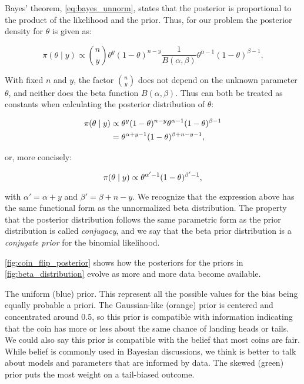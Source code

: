 Bayes' theorem, \autoref{eq:bayes_unnorm}, states that the posterior is proportional to the product of the likelihood and the prior. Thus, for our problem the posterior density for $\theta$ is given as: 

\begin{equation*}
    \pi (\theta \mid y) \propto \binom{n}{y} \theta^y (1-\theta)^{n-y} \frac{1}{B(\alpha, \beta)} \theta^{\alpha-1}(1-\theta)^{\beta -1}.
\end{equation*}

With fixed $n$ and $y$, the factor $\binom{n}{y}$ does not depend on the unknown parameter $\theta$, and neither does the beta function $B(\alpha, \beta)$. Thus can both be treated as constants when calculating the posterior distribution of $\theta$:

\begin{align*}
    \pi \qty(\theta \mid y) &\propto \theta^y (1-\theta)^{n-y} \theta^{\alpha-1}(1-\theta)^{\beta -1} \\
    &= \theta^{\alpha + y -1} (1-\theta)^{\beta + n-y -1},
\end{align*}

or, more concisely:

\begin{equation}\label{eq:coin_posterior}
    \pi \qty(\theta \mid y) \propto \theta^{\alpha' -1} (1-\theta)^{\beta' -1},
\end{equation}

with $\alpha'=\alpha+y$ and $\beta' = \beta + n - y$. We recognize that the expression above has the same functional form as the unnormalized beta distribution. The property that the posterior distribution follows the same parametric form as the prior distribution is called \textit{conjugacy}, and we say that the beta prior distribution is a \textit{conjugate prior} for the binomial likelihood.  

\autoref{fig:coin_flip_posterior} shows how the posteriors for the priors in \autoref{fig:beta_distribution} evolve as more and more data become available. 

The uniform (blue) prior. This represent all the possible values for the bias being equally probable a priori.
The Gaussian-like (orange) prior is centered and concentrated around 0.5, so this prior is compatible with information indicating that the coin has more or less about the same chance of landing heads or tails. We could also say this prior is compatible with the belief that most coins are fair. While belief is commonly used in Bayesian discussions, we think is better to talk about models and parameters that are informed by data.
The skewed (green) prior puts the most weight on a tail-biased outcome.

